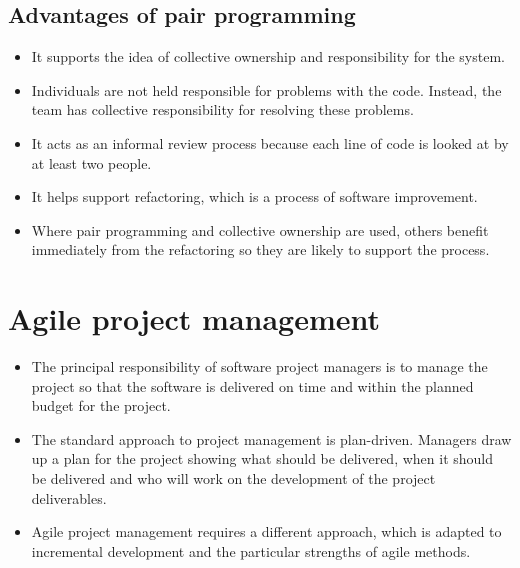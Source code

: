 \subsection{Advantages of pair programming}
\begin{itemize}

\item It supports the idea of collective ownership and responsibility for the system.

\item Individuals are not held responsible for problems with the code. Instead, the team has collective responsibility for resolving these problems.

\item It acts as an informal review process because each line of code is looked at by at least two people.

\item It helps support refactoring, which is a process of software improvement.

\item Where pair programming and collective ownership are used, others benefit immediately from the refactoring so they are likely to support the process.

\end{itemize}

\section{ Agile project management}
\begin{itemize}
\item The principal responsibility of software project managers is to manage the project so that the software is delivered on time and within the planned budget for the project.

\item The standard approach to project management is plan-driven. Managers draw up a plan for the project showing what should be delivered, when it should be delivered and who will work on the development of the project deliverables.

\item Agile project management requires a different approach, which is adapted to incremental development and the particular strengths of agile methods.


\end{itemize}
